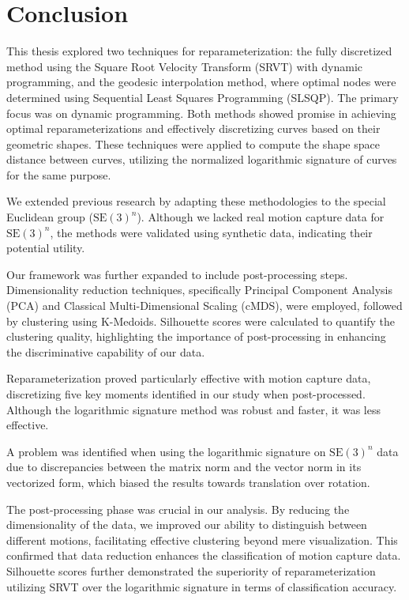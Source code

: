\chapter{Conclusion}
\label{ch:conclusion}

This thesis explored two techniques for reparameterization: the fully discretized method using the Square Root Velocity Transform (SRVT) with dynamic programming, and the geodesic interpolation method, where optimal nodes were determined using Sequential Least Squares Programming (SLSQP). The primary focus was on dynamic programming. Both methods showed promise in achieving optimal reparameterizations and effectively discretizing curves based on their geometric shapes. These techniques were applied to compute the shape space distance between curves, utilizing the normalized logarithmic signature of curves for the same purpose.

We extended previous research by adapting these methodologies to the special Euclidean group (\(\mathrm{SE}(3)^n\)). Although we lacked real motion capture data for \(\mathrm{SE}(3)^n\), the methods were validated using synthetic data, indicating their potential utility.

Our framework was further expanded to include post-processing steps. Dimensionality reduction techniques, specifically Principal Component Analysis (PCA) and Classical Multi-Dimensional Scaling (cMDS), were employed, followed by clustering using K-Medoids. Silhouette scores were calculated to quantify the clustering quality, highlighting the importance of post-processing in enhancing the discriminative capability of our data.

Reparameterization proved particularly effective with motion capture data, discretizing five key moments identified in our study when post-processed. Although the logarithmic signature method was robust and faster, it was less effective. 

A problem was identified when using the logarithmic signature on \(\mathrm{SE}(3)^n\) data due to discrepancies between the matrix norm and the vector norm in its vectorized form, which biased the results towards translation over rotation. 

The post-processing phase was crucial in our analysis. By reducing the dimensionality of the data, we improved our ability to distinguish between different motions, facilitating effective clustering beyond mere visualization. This confirmed that data reduction enhances the classification of motion capture data. Silhouette scores further demonstrated the superiority of reparameterization utilizing SRVT over the logarithmic signature in terms of classification accuracy.

